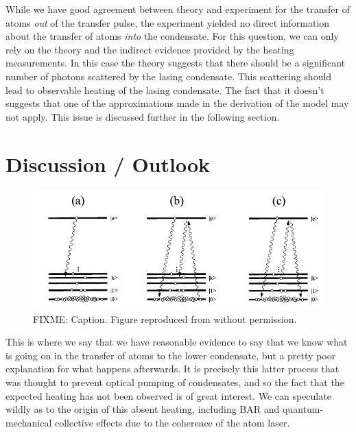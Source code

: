 \parasep

While we have good agreement between theory and experiment for the transfer of atoms \emph{out} of the transfer pulse, the experiment yielded no direct information about the transfer of atoms \emph{into} the condensate.  For this question, we can only rely on the theory and the indirect evidence provided by the heating measurements.  In this case the theory suggests that there should be a significant number of photons scattered by the lasing condensate.  This scattering should lead to observable heating of the lasing condensate.  The fact that it doesn't suggests that one of the approximations made in the derivation of the model may not apply.  This issue is discussed further in the following section.

\section{Discussion / Outlook}
\label{OpticalPumping:Discussion}

\begin{figure}
    \centering
    \includegraphics[width=14cm]{BARProcesses}
    \caption{FIXME: Caption.  Figure reproduced from \citep{Cirac:1996rr} without permission.}
    \label{OpticalPumping:BARProcesses}
\end{figure}

This is where we say that we have reasonable evidence to say that we know what is going on in the transfer of atoms to the lower condensate, but a pretty poor explanation for what happens afterwards.  It is precisely this latter process that was thought to prevent optical pumping of condensates, and so the fact that the expected heating has not been observed is of great interest.  We can speculate wildly as to the origin of this absent heating, including BAR and quantum-mechanical collective effects due to the coherence of the atom laser.

